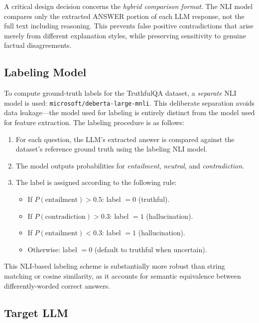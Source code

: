 A critical design decision concerns the \emph{hybrid comparison format}. The NLI model compares only the extracted \textsc{ANSWER} portion of each LLM response, not the full text including reasoning. This prevents false positive contradictions that arise merely from different explanation styles, while preserving sensitivity to genuine factual disagreements.

\subsection{Labeling Model}
\label{sec:label-model}

To compute ground-truth labels for the TruthfulQA dataset, a \emph{separate} NLI model is used: \texttt{microsoft/deberta-large-mnli}. This deliberate separation avoids data leakage---the model used for labeling is entirely distinct from the model used for feature extraction. The labeling procedure is as follows:

\begin{enumerate}
    \item For each question, the LLM's extracted answer is compared against the dataset's reference ground truth using the labeling NLI model.
    \item The model outputs probabilities for \emph{entailment}, \emph{neutral}, and \emph{contradiction}.
    \item The label is assigned according to the following rule:
    \begin{itemize}
        \item If $P(\text{entailment}) > 0.5$: label $= 0$ (truthful).
        \item If $P(\text{contradiction}) > 0.3$: label $= 1$ (hallucination).
        \item If $P(\text{entailment}) < 0.3$: label $= 1$ (hallucination).
        \item Otherwise: label $= 0$ (default to truthful when uncertain).
    \end{itemize}
\end{enumerate}

This NLI-based labeling scheme is substantially more robust than string matching or cosine similarity, as it accounts for semantic equivalence between differently-worded correct answers.

\subsection{Target LLM}

